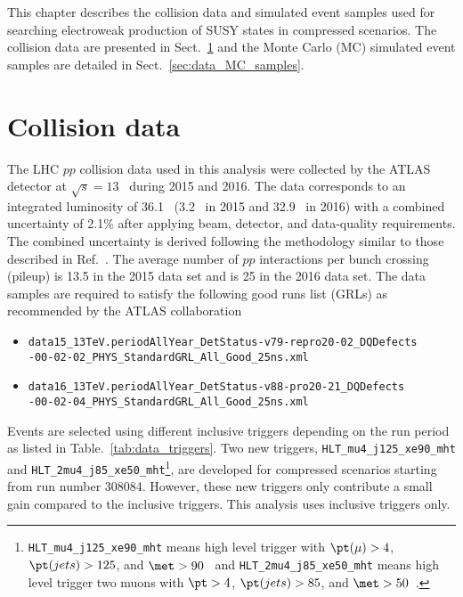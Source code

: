 This chapter describes the collision data and simulated event samples used for searching electroweak production of SUSY states in compressed scenarios.
The collision data are presented in Sect.~\ref{sec:data_collision_data} and the Monte Carlo (MC) simulated event samples are detailed in Sect.~\ref{sec:data_MC_samples}.


\section{Collision data}
\label{sec:data_collision_data}
The LHC $pp$ collision data used in this analysis were collected by the ATLAS detector at $\sqrt{s} = 13$~{\TeV} during 2015 and 2016.
The data corresponds to an integrated luminosity of 36.1~{\ifb} (3.2~{\ifb} in 2015 and 32.9~{\ifb} in 2016) with a combined uncertainty of 2.1\% after applying beam, detector, and data-quality requirements.
The combined uncertainty is derived following the methodology similar to those described in Ref.~\cite{Aaboud:2016hhf}.
The average number of $pp$ interactions per bunch crossing (pileup) is 13.5 in the 2015 data set and is 25 in the 2016 data set.
The data samples are required to satisfy the following good runs list (GRLs) as recommended by the ATLAS collaboration
%
\begin{itemize}
    \item \texttt{data15\_13TeV.periodAllYear\_DetStatus-v79-repro20-02\_DQDefects\\-00-02-02\_PHYS\_StandardGRL\_All\_Good\_25ns.xml}
    \item \texttt{data16\_13TeV.periodAllYear\_DetStatus-v88-pro20-21\_DQDefects\\-00-02-04\_PHYS\_StandardGRL\_All\_Good\_25ns.xml}
\end{itemize}
%
Events are selected using different inclusive \met triggers depending on the run period as listed in Table.~\ref{tab:data_triggers}.
Two new triggers, \texttt{HLT\_mu4\_j125\_xe90\_mht} and \texttt{HLT\_2mu4\_j85\_xe50\_mht}\footnote{\texttt{HLT\_mu4\_j125\_xe90\_mht} means high level trigger with $\pt(\mu) > 4$, $\pt(jets) > 125$, and $\met > 90$~{\GeV} and \texttt{HLT\_2mu4\_j85\_xe50\_mht} means high level trigger two muons with $\pt > 4$, $\pt(jets) > 85$, and $\met > 50$~{\GeV}.}, are developed for compressed scenarios starting from run number 308084.
However, these new triggers only contribute a small gain compared to the inclusive \met triggers.
This analysis uses inclusive \met triggers only.

